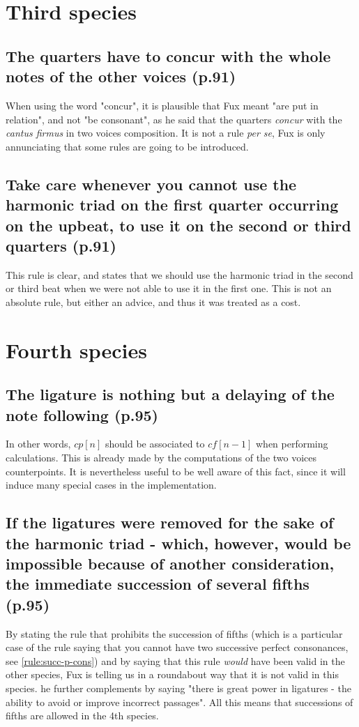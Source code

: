 \section{Third species}
\subsection{The quarters have to concur with the whole notes of the other voices (p.91)}
When using the word "concur", it is plausible that Fux meant "are put in relation", and not "be consonant", as he said that the quarters \textit{concur} with the \textit{cantus firmus} in two voices composition. It is not a rule \textit{per se}, Fux is only annunciating that some rules are going to be introduced.

\subsection{Take care whenever you cannot use the harmonic triad on the first quarter occurring on the upbeat, to use it on the second or third quarters (p.91)}
This rule is clear, and states that we should use the harmonic triad in the second or third beat when we were not able to use it in the first one. This is not an absolute rule, but either an advice, and thus it was treated as a cost.



\section{Fourth species}
\subsection{The ligature is nothing but a delaying of the note following (p.95)}
In other words, $cp[n]$ should be associated to $cf[n-1]$ when performing calculations. This is already made by the computations of the two voices counterpoints. It is nevertheless useful to be well aware of this fact, since it will induce many special cases in the implementation.

\subsection{If the ligatures were removed for the sake of the harmonic triad - which, however, would be impossible because of another consideration, the immediate succession of several fifths (p.95)}
By stating the rule that prohibits the succession of fifths (which is a particular case of the rule saying that you cannot have two successive perfect consonances, see \ref{rule:succ-p-cons}) and by saying that this rule \textit{would} have been valid in the other species, Fux is telling us in a roundabout way that it is not valid in this species. he further complements by saying "there is great power in ligatures - the ability to avoid or improve incorrect passages". All this means that successions of fifths are allowed in the 4th species.

